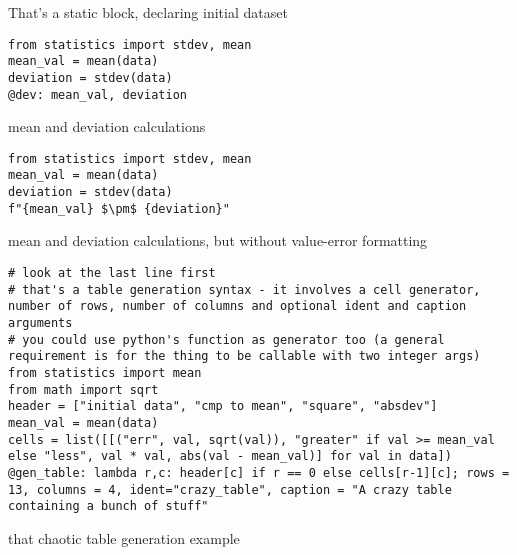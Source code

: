 \documentclass[a4paper]{article}
\begin{document}
That's a static block, declaring initial dataset
\newline

\begin{verbatim}
from statistics import stdev, mean
mean_val = mean(data)
deviation = stdev(data)
@dev: mean_val, deviation
\end{verbatim}

mean and deviation calculations
\newline

\begin{verbatim}
from statistics import stdev, mean
mean_val = mean(data)
deviation = stdev(data)
f"{mean_val} $\pm$ {deviation}"
\end{verbatim}

mean and deviation calculations, but without value-error formatting
\newline

\begin{verbatim}
# look at the last line first
# that's a table generation syntax - it involves a cell generator, number of rows, number of columns and optional ident and caption arguments
# you could use python's function as generator too (a general requirement is for the thing to be callable with two integer args)
from statistics import mean
from math import sqrt
header = ["initial data", "cmp to mean", "square", "absdev"]
mean_val = mean(data)
cells = list([[("err", val, sqrt(val)), "greater" if val >= mean_val else "less", val * val, abs(val - mean_val)] for val in data])
@gen_table: lambda r,c: header[c] if r == 0 else cells[r-1][c]; rows = 13, columns = 4, ident="crazy_table", caption = "A crazy table containing a bunch of stuff"
\end{verbatim}

that chaotic table generation example
\newline
\end{document}
